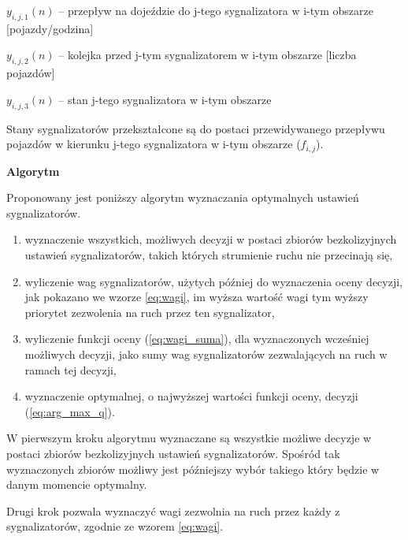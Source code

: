 \begin{math} y_{i, j, 1} (n) \end{math} \textrm{ -- przepływ na dojeździe do j-tego sygnalizatora w i-tym obszarze [pojazdy/godzina]}

\begin{math} y_{i, j, 2} (n) \end{math} \textrm{ -- kolejka przed j-tym sygnalizatorem w i-tym obszarze [liczba pojazdów]}

\begin{math} y_{i, j, 3} (n) \end{math} \textrm{ -- stan j-tego sygnalizatora w i-tym obszarze}

\vspace{0.5cm}
Stany sygnalizatorów przekształcone są do postaci przewidywanego przepływu pojazdów w kierunku j-tego sygnalizatora w i-tym obszarze (\begin{math} f_{i, j} \end{math}).

\vspace{1.5cm}
\textbf{Algorytm}

Proponowany jest poniższy algorytm wyznaczania optymalnych ustawień sygnalizatorów.
\begin{enumerate}
	\item wyznaczenie wszystkich, możliwych decyzji w postaci zbiorów bezkolizyjnych ustawień sygnalizatorów, takich których strumienie ruchu nie przecinają się,
	\item wyliczenie wag sygnalizatorów, użytych później do wyznaczenia oceny decyzji, jak pokazano we wzorze \ref{eq:wagi}, im wyższa wartość wagi tym wyższy priorytet zezwolenia na ruch przez ten sygnalizator,
	\item wyliczenie funkcji oceny (\ref{eq:wagi_suma}), dla wyznaczonych wcześniej możliwych decyzji, jako sumy wag sygnalizatorów zezwalających na ruch w ramach tej decyzji,
	\item wyznaczenie optymalnej, o najwyższej wartości funkcji oceny, decyzji (\ref{eq:arg_max_q}).
\end{enumerate}

\vspace{0.5cm}
W pierwszym kroku algorytmu wyznaczane są wszystkie możliwe decyzje w postaci zbiorów bezkolizyjnych ustawień sygnalizatorów.
Spośród tak wyznaczonych zbiorów możliwy jest późniejszy wybór takiego który będzie w danym momencie optymalny.

\vspace{0.5cm}
Drugi krok pozwala wyznaczyć wagi zezwolnia na ruch przez każdy z sygnalizatorów, zgodnie ze wzorem \ref{eq:wagi}.


